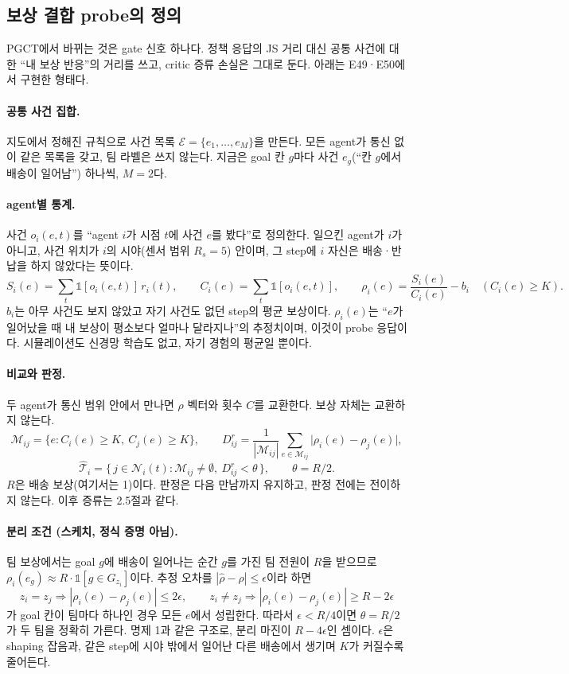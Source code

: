 \documentclass[11pt]{article}
\begin{document}
\subsection{보상 결합 probe의 정의}
PGCT에서 바뀌는 것은 gate 신호 하나다. 정책 응답의 JS 거리 대신 공통 사건에 대한 ``내 보상 반응''의 거리를 쓰고, critic 증류 손실은 그대로 둔다. 아래는 E49·E50에서 구현한 형태다.

\paragraph{공통 사건 집합.} 지도에서 정해진 규칙으로 사건 목록 $\mathcal{E} = \{e_1, \dots, e_M\}$을 만든다. 모든 agent가 통신 없이 같은 목록을 갖고, 팀 라벨은 쓰지 않는다. 지금은 goal 칸 $g$마다 사건 $e_g$(``칸 $g$에서 배송이 일어남'') 하나씩, $M = 2$다.

\paragraph{agent별 통계.} 사건 $o_i(e,t)$를 ``agent $i$가 시점 $t$에 사건 $e$를 봤다''로 정의한다. 일으킨 agent가 $i$가 아니고, 사건 위치가 $i$의 시야(센서 범위 $R_s = 5$) 안이며, 그 step에 $i$ 자신은 배송·반납을 하지 않았다는 뜻이다.
\[
  S_i(e) = \sum_t \mathbb{1}[o_i(e,t)]\, r_i(t), \qquad
  C_i(e) = \sum_t \mathbb{1}[o_i(e,t)], \qquad
  \rho_i(e) = \frac{S_i(e)}{C_i(e)} - b_i \quad (C_i(e) \ge K).
\]
$b_i$는 아무 사건도 보지 않았고 자기 사건도 없던 step의 평균 보상이다. $\rho_i(e)$는 ``$e$가 일어났을 때 내 보상이 평소보다 얼마나 달라지나''의 추정치이며, 이것이 probe 응답이다. 시뮬레이션도 신경망 학습도 없고, 자기 경험의 평균일 뿐이다.

\paragraph{비교와 판정.} 두 agent가 통신 범위 안에서 만나면 $\rho$ 벡터와 횟수 $C$를 교환한다. 보상 자체는 교환하지 않는다.
\[
  \mathcal{M}_{ij} = \{e : C_i(e) \ge K,\ C_j(e) \ge K\}, \qquad
  D^r_{ij} = \frac{1}{|\mathcal{M}_{ij}|} \sum_{e \in \mathcal{M}_{ij}} \big|\rho_i(e) - \rho_j(e)\big|,
\]
\[
  \hat{\mathcal{T}}_i = \{\, j \in \mathcal{N}_i(t) : \mathcal{M}_{ij} \ne \emptyset,\ D^r_{ij} < \theta \,\}, \qquad \theta = R/2.
\]
$R$은 배송 보상(여기서는 1)이다. 판정은 다음 만남까지 유지하고, 판정 전에는 전이하지 않는다. 이후 증류는 2.5절과 같다.

\paragraph{분리 조건 (스케치, 정식 증명 아님).} 팀 보상에서는 goal $g$에 배송이 일어나는 순간 $g$를 가진 팀 전원이 $R$을 받으므로 $\rho_i(e_g) \approx R \cdot \mathbb{1}[g \in G_{z_i}]$이다. 추정 오차를 $|\hat\rho - \rho| \le \epsilon$이라 하면
\[
  z_i = z_j \Rightarrow |\rho_i(e) - \rho_j(e)| \le 2\epsilon, \qquad
  z_i \ne z_j \Rightarrow |\rho_i(e) - \rho_j(e)| \ge R - 2\epsilon
\]
가 goal 칸이 팀마다 하나인 경우 모든 $e$에서 성립한다. 따라서 $\epsilon < R/4$이면 $\theta = R/2$가 두 팀을 정확히 가른다. 명제 1과 같은 구조로, 분리 마진이 $R - 4\epsilon$인 셈이다. $\epsilon$은 shaping 잡음과, 같은 step에 시야 밖에서 일어난 다른 배송에서 생기며 $K$가 커질수록 줄어든다.
\end{document}
